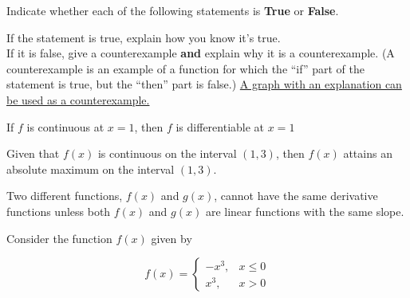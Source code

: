 \documentclass[handout]{ximera}
\begin{document}
\begin{problem}
Indicate whether each of the following statements is \textbf{True} or \textbf{False}.

If the statement is true, explain how you know it's true.\\



If it is false, give a counterexample \textbf{and} explain why it is a counterexample. (A counterexample is an example of a function for which the ``if'' part of the statement is true, but the ``then'' part is false.) \underline{A graph with an explanation can be used as a counterexample.}\\


\begin{question}
If $f$ is continuous at $x=1$, then $f$ is differentiable at $x=1$
    \begin{multipleChoice}
    \end{multipleChoice}
\end{question}


\begin{question}
	Given that $f(x)$ is continuous on the interval $(1,3)$, then $f(x)$ attains an absolute maximum on the interval $(1,3)$.\\
    
    \begin{multipleChoice}
    \end{multipleChoice}
\end{question}


\begin{question}
    Two different functions, $f(x)$ and $g(x)$, cannot have the same derivative functions unless both $f(x)$ and $g(x)$ are linear functions with the same slope.
    \begin{multipleChoice}
    \end{multipleChoice}
\end{question}

\end{problem}


\begin{problem}
Consider the function $f(x)$ given by

$$f(x) = \begin{cases} \displaystyle -x^3, & x \leq 0 \\ x^3, & x >0 \end{cases}$$
\end{problem}
\end{document}
